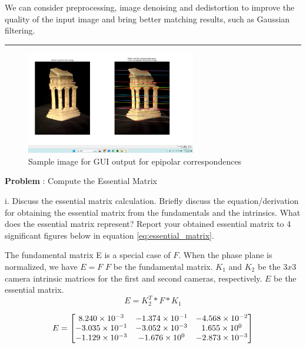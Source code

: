 \documentclass[onecolumn,10pt]{article}
\begin{document}
We can consider preprocessing, image denoising and dedistortion to improve the quality of the input image and bring better matching results, such as Gaussian filtering.
\hrule
\begin{figure}
  \centering
  \includegraphics[width=0.66\textwidth]{media/Epiploar correspondence.png} %
  \caption{Sample image for GUI output for epipolar correspondences}
  \label{fig:epipolar_corresp}
\end{figure}

\addtocounter{problemnumber}{1}
\noindent\textbf{Problem }:  Compute the Essential Matrix

i. Discuss the essential matrix calculation. Briefly discuss the equation/derivation for obtaining the essential matrix from the fundamentals and the intrinsics. What does the essential matrix represent? Report your obtained essential matrix to 4 significant figures below in equation \ref{eq:essential_matrix}.

The fundamental matrix E is a special case of $F$. When the phase plane is normalized, we have $E=F$
$F$ be the fundamental matrix.
$K_1$ and $K_2$ be the $3x3$ camera intrinsic matrices for the first and second cameras, respectively. 
$E$ be the essential matrix.
$$E = K_2^T * F * K_1$$

\begin{align}
E = \begin{bmatrix}
\multicolumn{1}{c}{8.240 \times 10^{-3}} & \multicolumn{1}{c}{-1.374 \times 10^{-1}} & \multicolumn{1}{c}{-4.568 \times 10^{-2}} \\ 
\multicolumn{1}{c}{-3.035 \times 10^{-1}} & \multicolumn{1}{c}{-3.052 \times 10^{-3}} & \multicolumn{1}{c}{1.655 \times 10^{0}} \\ 
\multicolumn{1}{c}{-1.129 \times 10^{-3}}  & \multicolumn{1}{c}{-1.676 \times 10^{0}} & \multicolumn{1}{c}{-2.873 \times 10^{-3}} \\ 
\end{bmatrix}
\label{eq:essential_matrix}
\end{align}
\end{document}
